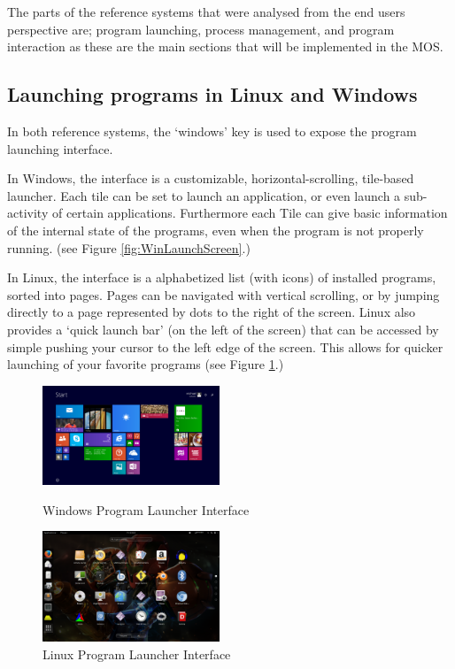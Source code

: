 \documentclass[a4paper]{report}
\begin{document}
The parts of the reference systems that were analysed from the end users perspective are; program launching, process management, and program interaction as these are the main sections that will be implemented in the MOS.

\subsection{Launching programs in Linux and Windows}

In both reference systems, the `windows' key is used to expose the program launching interface.

In Windows, the interface is a customizable, horizontal-scrolling, tile-based launcher. Each tile can be set to launch an application, or even launch a sub-activity of certain applications. Furthermore each Tile can give basic information of the internal state of the programs, even when the program is not properly running. (see Figure \ref{fig:WinLaunchScreen}.)


In Linux, the interface is a alphabetized list (with icons) of installed programs, sorted into pages. Pages can be navigated with vertical scrolling, or by jumping directly to a page represented by dots to the right of the screen. Linux also provides a `quick launch bar' (on the left of the screen) that can be accessed by simple pushing your cursor to the left edge of the screen. This allows for quicker launching of your favorite programs (see Figure \ref{fig:LinLaunchScreen}.)


\begin{figure}[ht]
\centering
\begin{minipage}{.5\textwidth}
  \centering
  \includegraphics[width=200px]{images/Windows_Program_Launcher_Screenshot}
  \caption{Windows Program Launcher Interface}
  \label{fig:WinLaunchScreen}
\end{minipage}%
\begin{minipage}{.5\textwidth}
  \centering
  \includegraphics[width=200px]{images/Linux_Program_Launcher_Screenshot}
  \caption{Linux Program Launcher Interface}
  \label{fig:LinLaunchScreen}
\end{minipage}
\end{figure}
\end{document}
